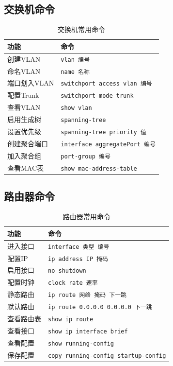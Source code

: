 \documentclass[12pt,a4paper]{ctexart}
\begin{document}
\subsection{交换机命令}

\begin{table}[htbp]
\centering\small
\begin{tabular}{ll}
\toprule
\textbf{功能} & \textbf{命令} \\
\midrule
创建VLAN & \texttt{vlan 编号} \\
命名VLAN & \texttt{name 名称} \\
端口划入VLAN & \texttt{switchport access vlan 编号} \\
配置Trunk & \texttt{switchport mode trunk} \\
查看VLAN & \texttt{show vlan} \\
启用生成树 & \texttt{spanning-tree} \\
设置优先级 & \texttt{spanning-tree priority 值} \\
创建聚合端口 & \texttt{interface aggregatePort 编号} \\
加入聚合组 & \texttt{port-group 编号} \\
查看MAC表 & \texttt{show mac-address-table} \\
\bottomrule
\end{tabular}
\caption{交换机常用命令}
\end{table}

\subsection{路由器命令}

\begin{table}[htbp]
\centering\small
\begin{tabular}{ll}
\toprule
\textbf{功能} & \textbf{命令} \\
\midrule
进入接口 & \texttt{interface 类型 编号} \\
配置IP & \texttt{ip address IP 掩码} \\
启用接口 & \texttt{no shutdown} \\
配置时钟 & \texttt{clock rate 速率} \\
静态路由 & \texttt{ip route 网络 掩码 下一跳} \\
默认路由 & \texttt{ip route 0.0.0.0 0.0.0.0 下一跳} \\
查看路由表 & \texttt{show ip route} \\
查看接口 & \texttt{show ip interface brief} \\
查看配置 & \texttt{show running-config} \\
保存配置 & \texttt{copy running-config startup-config} \\
\bottomrule
\end{tabular}
\caption{路由器常用命令}
\end{table}
\end{document}
